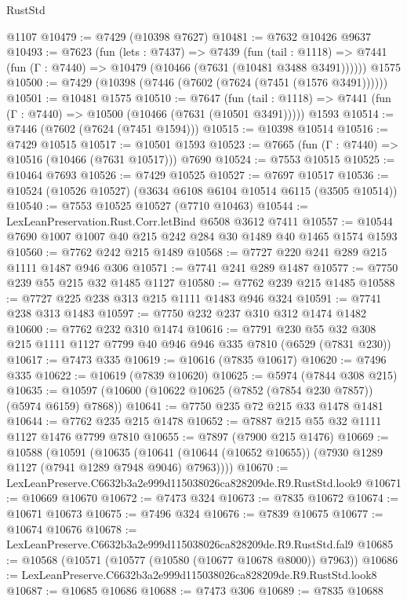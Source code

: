 \begin{lexlean}{RustStd}
\begin{coremodule}
    @1107
@10479 := @7429 (@10398 @7627)
@10481 := @7632 @10426 @9637
@10493 := @7623
    (fun (lets : @7437) =>
    @7439
      (fun (tail : @1118) =>
      @7441 (fun (Γ : @7440) => @10479 (@10466 (@7631 (@10481 @3488 @3491))))))
    @1575
@10500 := @7429 (@10398 (@7446 (@7602 (@7624 (@7451 (@1576 @3491))))))
@10501 := @10481 @1575
@10510 := @7647
    (fun (tail : @1118) => @7441 (fun (Γ : @7440) => @10500 (@10466 (@7631 (@10501 @3491)))))
    @1593
@10514 := @7446 (@7602 (@7624 (@7451 @1594)))
@10515 := @10398 @10514
@10516 := @7429 @10515
@10517 := @10501 @1593
@10523 := @7665 (fun (Γ : @7440) => @10516 (@10466 (@7631 @10517))) @7690
@10524 := @7553 @10515
@10525 := @10464 @7693
@10526 := @7429 @10525
@10527 := @7697 @10517
@10536 := @10524 (@10526 @10527) (@3634 @6108 @6104 @10514 @6115 (@3505 @10514))
@10540 := @7553 @10525 @10527 (@7710 @10463)
@10544 := LexLeanPreservation.Rust.Corr.letBind @6508 @3612 @7411
@10557 := @10544 @7690 @1007 @1007 @40 @215 @242 @284 @30 @1489 @40 @1465 @1574 @1593
@10560 := @7762 @242 @215 @1489
@10568 := @7727 @220 @241 @289 @215 @1111 @1487 @946 @306
@10571 := @7741 @241 @289 @1487
@10577 := @7750 @239 @55 @215 @32 @1485 @1127
@10580 := @7762 @239 @215 @1485
@10588 := @7727 @225 @238 @313 @215 @1111 @1483 @946 @324
@10591 := @7741 @238 @313 @1483
@10597 := @7750 @232 @237 @310 @312 @1474 @1482
@10600 := @7762 @232 @310 @1474
@10616 := @7791
    @230
    @55
    @32
    @308
    @215
    @1111
    @1127
    @7799
    @40
    @946
    @946
    @335
    @7810
    (@6529 (@7831 @230))
@10617 := @7473 @335
@10619 := @10616 (@7835 @10617)
@10620 := @7496 @335
@10622 := @10619 (@7839 @10620)
@10625 := @5974 (@7844 @308 @215)
@10635 := @10597 (@10600 (@10622 @10625 (@7852 (@7854 @230 @7857)) (@5974 @6159) @7868))
@10641 := @7750 @235 @72 @215 @33 @1478 @1481
@10644 := @7762 @235 @215 @1478
@10652 := @7887 @215 @55 @32 @1111 @1127 @1476 @7799 @7810
@10655 := @7897 (@7900 @215 @1476)
@10669 := @10588
    (@10591
      (@10635
        (@10641 (@10644 (@10652 @10655)) (@7930 @1289 @1127 (@7941 @1289 @7948 @9046) @7963))))
@10670 := LexLeanPreserve.C6632b3a2e999d115038026ca828209de.R9.RustStd.look9
@10671 := @10669 @10670
@10672 := @7473 @324
@10673 := @7835 @10672
@10674 := @10671 @10673
@10675 := @7496 @324
@10676 := @7839 @10675
@10677 := @10674 @10676
@10678 := LexLeanPreserve.C6632b3a2e999d115038026ca828209de.R9.RustStd.fal9
@10685 := @10568 (@10571 (@10577 (@10580 (@10677 @10678 @8000)) @7963))
@10686 := LexLeanPreserve.C6632b3a2e999d115038026ca828209de.R9.RustStd.look8
@10687 := @10685 @10686
@10688 := @7473 @306
@10689 := @7835 @10688

\end{coremodule}
\end{lexlean}
